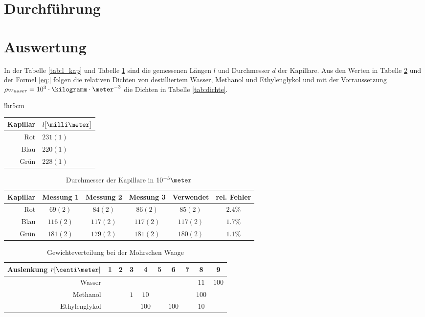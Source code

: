\documentclass[12pt, a4paper, twoside]{scrartcl}
\begin{document}
\section{Durchführung}
\label{sec:durchfuehrung}

\section{Auswertung}
\label{sec:auswertung}

In der Tabelle \ref{tab:l_kap} und Tabelle \ref{tab:d_kap} sind die gemessenen Längen $l$ und Durchmesser $d$ der Kapillare.
Aus den Werten in Tabelle \ref{tab:mohrsche_waage} und der Formel \eqref{eq:} folgen die relativen Dichten von destilliertem Wasser, Methanol und Ethylenglykol und mit der Vorraussetzung $\rho _{Wasser} = 10^{3}\cdot\kilogramm\cdot\meter^{-3}$ die Dichten in Tabelle \ref{tab:dichte}.

\begin{wraptable}{!hr}{5cm}
\centering
\begin{tabular}{r|l}
    Kapillar & $l[\milli\meter]$\\
    \hline
    Rot & $231(1)$\\
    Blau & $220(1)$\\
    Grün & $228(1)$\\
    
 \end{tabular} 
 \caption{\label{tab:l_kap}Länge $l$ der Kapillare}
\end{wraptable}

\begin{table}
\centering
\begin{tabular}{r|c|c|c||c|c}
    Kapillar & Messung 1 & Messung 2 & Messung 3 & Verwendet & rel. Fehler\\
    \hline
    Rot & $69(2)$ & $84(2)$ & $86(2)$ & $85(2)$ & $ 2.4\%$\\
    Blau & $116(2)$ & $117(2)$ & $117(2)$ & $117(2)$ & $ 1.7\%$\\
    Grün & $181(2)$ & $179(2)$ & $181(2)$ & $180(2)$ & $ 1.1\%$\\
    
 \end{tabular} 
 \caption{\label{tab:d_kap} Durchmesser der Kapillare in $ 10^{-5} \meter$}
\end{table}

\begin{table}
\centering
\begin{tabular}{r|c|c|c|c|c|c|c|c|c}
    Auslenkung $r[\centi\meter]$ & 1 & 2 & 3 & 4 & 5 & 6 & 7 & 8 & 9\\
    \hline
    \hline
    Wasser & & & & & & & & $11$ & $100$ \\
    \hline
    Methanol & & & $1$ & $10$ & & & & $100$ & \\
    \hline
    Ethylenglykol & & & & $100$ & & $100$ & & $10$ & \\
    
 \end{tabular} 
 \caption{\label{tab:mohrsche_waage}Gewichteverteilung bei der Mohrschen Waage}
\end{table}
\end{document}
